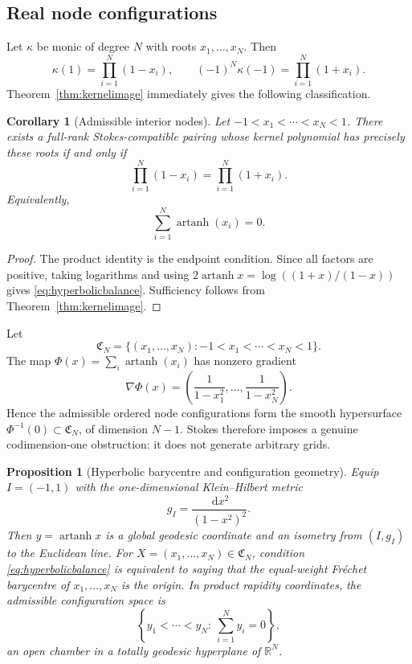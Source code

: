 \documentclass[11pt,a4paper]{article}
\newtheorem{proposition}[theorem]{Proposition}
\newtheorem{corollary}[theorem]{Corollary}
\theoremstyle{definition}
\theoremstyle{remark}
\newcommand{\R}{\mathbb{R}}
\newcommand{\dd}{\,\mathrm{d}}
\begin{document}
\subsection{Real node configurations}

Let $\kappa$ be monic of degree $N$ with roots $x_1,\ldots,x_N$.  Then
\[
 \kappa(1)=\prod_{i=1}^N(1-x_i),
 \qquad
 (-1)^N\kappa(-1)=\prod_{i=1}^N(1+x_i).
\]
Theorem~\ref{thm:kernelimage} immediately gives the following classification.

\begin{corollary}[Admissible interior nodes]\label{cor:nodes}
Let $-1<x_1<\cdots<x_N<1$.  There exists a full-rank Stokes-compatible pairing whose
kernel polynomial has precisely these roots if and only if
\begin{equation}\label{eq:productbalance}
 \boxed{\prod_{i=1}^N(1-x_i)=\prod_{i=1}^N(1+x_i).}
\end{equation}
Equivalently,
\begin{equation}\label{eq:hyperbolicbalance}
 \boxed{\sum_{i=1}^N\operatorname{artanh}(x_i)=0.}
\end{equation}
\end{corollary}

\begin{proof}
The product identity is the endpoint condition.  Since all factors are positive, taking
logarithms and using
$2\operatorname{artanh}x=\log((1+x)/(1-x))$ gives \eqref{eq:hyperbolicbalance}.
Sufficiency follows from Theorem~\ref{thm:kernelimage}.
\end{proof}

Let
\[
 \mathfrak C_N=\{(x_1,\ldots,x_N):-1<x_1<\cdots<x_N<1\}.
\]
The map $\Phi(x)=\sum_i\operatorname{artanh}(x_i)$ has nonzero gradient
\[
 \nabla\Phi(x)=\left(\frac1{1-x_1^2},\ldots,\frac1{1-x_N^2}\right).
\]
Hence the admissible ordered node configurations form the smooth hypersurface
$\Phi^{-1}(0)\subset\mathfrak C_N$, of dimension $N-1$.  Stokes therefore imposes a genuine
codimension-one obstruction: it does not generate arbitrary grids.

\begin{proposition}[Hyperbolic barycentre and configuration geometry]
\label{prop:hyperbolicgeometry}
Equip $I=(-1,1)$ with the one-dimensional Klein--Hilbert metric
\begin{equation}\label{eq:hyperbolicmetric}
 g_I=\frac{\dd x^2}{(1-x^2)^2}.
\end{equation}
Then $y=\operatorname{artanh}x$ is a global geodesic coordinate and an isometry from
$(I,g_I)$ to the Euclidean line.  For $X=(x_1,\ldots,x_N)\in\mathfrak C_N$, condition
\eqref{eq:hyperbolicbalance} is equivalent to saying that the equal-weight Fr\'echet
barycentre of $x_1,\ldots,x_N$ is the origin.  In product rapidity coordinates, the
admissible configuration space is
\begin{equation}\label{eq:rapiditychamber}
 \left\{y_1<\cdots<y_N:\ \sum_{i=1}^Ny_i=0\right\},
\end{equation}
an open chamber in a totally geodesic hyperplane of $\R^N$.
\end{proposition}
\end{document}
